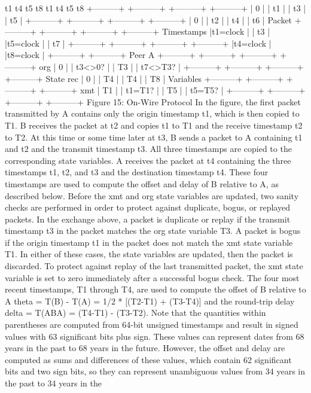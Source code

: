  t1 t4 t5 t8
 t1 t4 t5 t8
 +---------+ +---------+ +---------+ +---------+
 | 0 | | t1 | | t3 | | t5 |
 +---------+ +---------+ +---------+ +---------+
 | 0 | | t2 | | t4 | | t6 | Packet
 +---------+ +---------+ +---------+ +---------+ Timestamps
 |t1=clock | | t3 | |t5=clock | | t7 |
 +---------+ +---------+ +---------+ +---------+
 |t4=clock | |t8=clock |
 +---------+ +---------+
 Peer A
 +---------+ +---------+ +---------+ +---------+
 org | 0 | | t3<>0? | | T3 | | t7<>T3? |
 +---------+ +---------+ +---------+ +---------+ State
 rec | 0 | | T4 | | T4 | | T8 | Variables
 +---------+ +---------+ +---------+ +---------+
 xmt | T1 | | t1=T1? | | T5 | | t5=T5? |
 +---------+ +---------+ +---------+ +---------+
 Figure 15: On-Wire Protocol
In the figure, the first packet transmitted by A contains only the
 origin timestamp t1, which is then copied to T1. B receives the
 packet at t2 and copies t1 to T1 and the receive timestamp t2 to T2.
 At this time or some time later at t3, B sends a packet to A
 containing t1 and t2 and the transmit timestamp t3. All three
 timestamps are copied to the corresponding state variables. A
 receives the packet at t4 containing the three timestamps t1, t2, and
 t3 and the destination timestamp t4. These four timestamps are used
 to compute the offset and delay of B relative to A, as described
 below.
 Before the xmt and org state variables are updated, two sanity checks
 are performed in order to protect against duplicate, bogus, or
 replayed packets. In the exchange above, a packet is duplicate or
 replay if the transmit timestamp t3 in the packet matches the org
 state variable T3. A packet is bogus if the origin timestamp t1 in
 the packet does not match the xmt state variable T1. In either of
 these cases, the state variables are updated, then the packet is
 discarded. To protect against replay of the last transmitted packet,
 the xmt state variable is set to zero immediately after a successful
 bogus check.
 The four most recent timestamps, T1 through T4, are used to compute
 the offset of B relative to A
 theta = T(B) - T(A) = 1/2 * [(T2-T1) + (T3-T4)]
 and the round-trip delay
 delta = T(ABA) = (T4-T1) - (T3-T2).
 Note that the quantities within parentheses are computed from 64-bit
 unsigned timestamps and result in signed values with 63 significant
 bits plus sign. These values can represent dates from 68 years in
 the past to 68 years in the future. However, the offset and delay
 are computed as sums and differences of these values, which contain
 62 significant bits and two sign bits, so they can represent
 unambiguous values from 34 years in the past to 34 years in the
